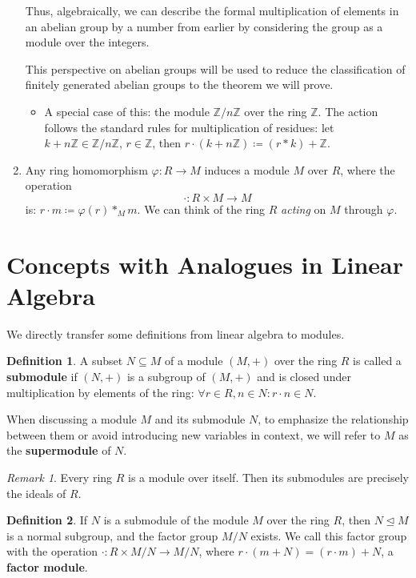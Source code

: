 \documentclass{article}
\newif\ifusemulticols
\newcommand\newterm[1]{\textbf{#1}}
\theoremstyle{definition}
\newtheorem{deff}{Definition}
\theoremstyle{remark}
\newtheorem*{note}{Remark}
\theoremstyle{plain}
\theoremstyle{plain}
\newenvironment{mymulticols}
    { \ifusemulticols \begin{multicols}{2} \fi }
    { \ifusemulticols \end{multicols} \fi }
\newcommand{\Z}{\mathbb{Z}}
\begin{document}
\begin{mymulticols}
\begin{enumerate}
        Thus, algebraically, we can describe the formal multiplication of elements in an abelian
        group by a number from earlier by considering the group as a module over the integers.

        This perspective on abelian groups will be used to reduce the classification of finitely
        generated abelian groups to the theorem we will prove.
        \begin{itemize}
            \item A special case of this: the module $\Z/n\Z$ over the ring $\Z$. The action follows
              the standard rules for multiplication of residues: let $k+n\Z \in \Z/n\Z$, $r \in \Z$,
              then $r \cdot (k + n\Z) \coloneqq (r*k) + \Z$.
        \end{itemize}

    \item Any ring homomorphism ${\varphi: R \to M}$ induces a module $M$ over $R$, where the operation
        $$\cdot: R \times M \to M$$ is: $r \cdot m \coloneqq \varphi(r) *_M m$. 
        We can think of the ring $R$ \emph{acting} on $M$ through $\varphi$.
\end{enumerate}

\section{Concepts with Analogues in Linear Algebra}
We directly transfer some definitions from linear algebra to modules.

\begin{deff}
    A subset $N \subseteq M$ of a module $(M, +)$ over the ring $R$ is called a \newterm{submodule} if $(N, +)$ is a subgroup of $(M, +)$ and is closed under multiplication by elements of the ring: $\forall r \in R, n \in N: r\cdot n \in N$.

    When discussing a module $M$ and its submodule $N$, to emphasize the relationship between them or avoid introducing new variables in context, we will refer to $M$ as the \newterm{supermodule} of $N$.
\end{deff}

\begin{note}
    Every ring $R$ is a module over itself. Then its submodules are precisely the ideals of $R$.
\end{note}

\begin{deff}
    If $N$ is a submodule of the module $M$ over the ring $R$, then $N \trianglelefteq M$ is a normal subgroup, and the factor group $M/N$ exists. We call this factor group with the operation $\cdot:R \times M/N \to M/N$, where $r \cdot (m + N) = (r \cdot m) + N$, a \newterm{factor module}.
\end{deff}


\end{mymulticols}
\end{document}
